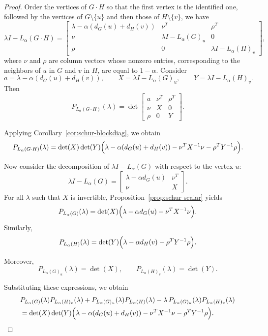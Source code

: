 \documentclass{article}
\begin{document}
\begin{proof}
Order the vertices of $G\cdot H$ so that the first vertex is the identified one, followed by the vertices of $G\setminus\{u\}$ and then those of $H\setminus\{v\}$, we have
\[
\lambda I - L_\alpha(G\cdot H)=
\begin{bmatrix}
\lambda-\alpha(d_G(u)+d_H(v)) & \nu^T & \rho^T\\
\nu & \lambda I - L_\alpha(G)_u & 0\\
\rho & 0 & \lambda I - L_\alpha(H)_v
\end{bmatrix},
\]
where $\nu$ and $\rho$ are column vectors whose nonzero entries, corresponding to the neighbors of $u$ in $G$ and $v$ in $H$, are equal to $1-\alpha$. Consider
\[
a=\lambda-\alpha(d_G(u)+d_H(v)), \qquad
X=\lambda I - L_\alpha(G)_u, \qquad
Y=\lambda I - L_\alpha(H)_v.
\]
Then
\[
P_{L_{\alpha}(G\cdot H)}(\lambda)
=
\det
\begin{bmatrix}
a & \nu^T & \rho^T\\
\nu & X & 0\\
\rho & 0 & Y
\end{bmatrix}.
\]

Applying Corollary~\ref{cor:schur-blockdiag}, we obtain
\begin{equation}\label{eq:coal-schur}
P_{L_{\alpha}(G\cdot H)}(\lambda)
=
\det(X)\det(Y)
\Bigl(
\lambda-\alpha(d_G(u)+d_H(v))
-\nu^TX^{-1}\nu
-\rho^TY^{-1}\rho
\Bigr).
\end{equation}

Now consider the decomposition of $\lambda I - L_\alpha(G)$ with respect to the vertex $u$:
\[
\lambda I - L_\alpha(G)=
\begin{bmatrix}
\lambda-\alpha d_G(u) & \nu^T\\
\nu & X
\end{bmatrix}.
\]
For all $\lambda$ such that $X$ is invertible, Proposition~\ref{prop:schur-scalar} yields
\[
P_{L_{\alpha}(G)}(\lambda)
=
\det(X)
\Bigl(
\lambda-\alpha d_G(u)-\nu^TX^{-1}\nu
\Bigr).
\]
Similarly,
\[
P_{L_{\alpha}(H)}(\lambda)
=
\det(Y)
\Bigl(
\lambda-\alpha d_H(v)-\rho^TY^{-1}\rho
\Bigr).
\]

Moreover,
\[
P_{L_{\alpha}(G)_u}(\lambda)=\det(X),
\qquad
P_{L_{\alpha}(H)_v}(\lambda)=\det(Y).
\]

Substituting these expressions, we obtain
\begin{align*}
&P_{L_{\alpha}(G)}(\lambda)P_{L_{\alpha}(H)_v}(\lambda)
+
P_{L_{\alpha}(G)_u}(\lambda)P_{L_{\alpha}(H)}(\lambda)
-
\lambda\,P_{L_{\alpha}(G)_u}(\lambda)P_{L_{\alpha}(H)_v}(\lambda)\\
&=
\det(X)\det(Y)
\Bigl(
\lambda-\alpha(d_G(u)+d_H(v))
-\nu^TX^{-1}\nu
-\rho^TY^{-1}\rho
\Bigr).
\end{align*}


\end{proof}
\end{document}
